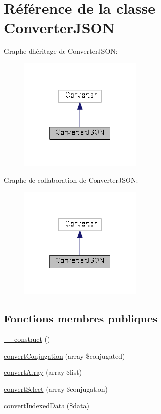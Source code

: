 \hypertarget{class_converter_j_s_o_n}{}\section{Référence de la classe Converter\+J\+S\+ON}
\label{class_converter_j_s_o_n}


Graphe d\textquotesingle{}héritage de Converter\+J\+S\+ON\+:
\nopagebreak
\begin{figure}[H]
\begin{center}
\leavevmode
\includegraphics[width=172pt]{class_converter_j_s_o_n__inherit__graph}
\end{center}
\end{figure}


Graphe de collaboration de Converter\+J\+S\+ON\+:
\nopagebreak
\begin{figure}[H]
\begin{center}
\leavevmode
\includegraphics[width=172pt]{class_converter_j_s_o_n__coll__graph}
\end{center}
\end{figure}
\subsection*{Fonctions membres publiques}
\begin{DoxyCompactItemize}
\item 
\hyperlink{class_converter_j_s_o_n_a133b135a9dd4246877f53fdd326c3c96}{\+\_\+\+\_\+construct} ()
\item 
\hyperlink{class_converter_j_s_o_n_a245ad3051426af9af7cbc251642f0c90}{convert\+Conjugation} (array \$conjugated)
\item 
\hyperlink{class_converter_j_s_o_n_a3ed7ca94bfa42fdb952bcb360a7fd4ae}{convert\+Array} (array \$list)
\item 
\hyperlink{class_converter_j_s_o_n_a62bbae5bb6a9aef4d648eddbe40fa16c}{convert\+Select} (array \$conjugation)
\item 
\hyperlink{class_converter_j_s_o_n_a005d755a0798196fb1ec12e374b695c0}{convert\+Indexed\+Data} (\$data)
\end{DoxyCompactItemize}


